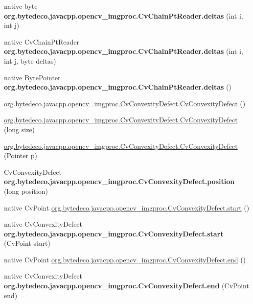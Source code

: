 \begin{DoxyCompactItemize}
native byte {\bfseries org.\+bytedeco.\+javacpp.\+opencv\+\_\+imgproc.\+Cv\+Chain\+Pt\+Reader.\+deltas} (int i, int j)
\item 
\mbox{\label{group__imgproc_gabe75007a635d826599cc4dc184bb489d}} 
native Cv\+Chain\+Pt\+Reader {\bfseries org.\+bytedeco.\+javacpp.\+opencv\+\_\+imgproc.\+Cv\+Chain\+Pt\+Reader.\+deltas} (int i, int j, byte deltas)
\item 
\mbox{\label{group__imgproc_ga1b1a34929239a97f33c9557cb26f3fef}} 
native Byte\+Pointer {\bfseries org.\+bytedeco.\+javacpp.\+opencv\+\_\+imgproc.\+Cv\+Chain\+Pt\+Reader.\+deltas} ()
\item 
\hyperlink{group__imgproc_ga5c579571d2c7ce238f166ac14d106dc0}{org.\+bytedeco.\+javacpp.\+opencv\+\_\+imgproc.\+Cv\+Convexity\+Defect.\+Cv\+Convexity\+Defect} ()
\item 
\hyperlink{group__imgproc_ga1bab8a5b2d8b0d218e13be2962c89bcf}{org.\+bytedeco.\+javacpp.\+opencv\+\_\+imgproc.\+Cv\+Convexity\+Defect.\+Cv\+Convexity\+Defect} (long size)
\item 
\hyperlink{group__imgproc_ga3ad9202789ae5ba03887b3a07a817674}{org.\+bytedeco.\+javacpp.\+opencv\+\_\+imgproc.\+Cv\+Convexity\+Defect.\+Cv\+Convexity\+Defect} (Pointer p)
\item 
\mbox{\label{group__imgproc_ga2b31965ab789a7387e133d5be5b1d6d4}} 
Cv\+Convexity\+Defect {\bfseries org.\+bytedeco.\+javacpp.\+opencv\+\_\+imgproc.\+Cv\+Convexity\+Defect.\+position} (long position)
\item 
native Cv\+Point \hyperlink{group__imgproc_gac3e9f4d6fda01551329024c0375d6ebb}{org.\+bytedeco.\+javacpp.\+opencv\+\_\+imgproc.\+Cv\+Convexity\+Defect.\+start} ()
\item 
\mbox{\label{group__imgproc_gab4d5d62f7df7e71f9ad218facb69aff2}} 
native Cv\+Convexity\+Defect {\bfseries org.\+bytedeco.\+javacpp.\+opencv\+\_\+imgproc.\+Cv\+Convexity\+Defect.\+start} (Cv\+Point start)
\item 
native Cv\+Point \hyperlink{group__imgproc_ga615474a436d4aa8cf5e74cbc1648f50b}{org.\+bytedeco.\+javacpp.\+opencv\+\_\+imgproc.\+Cv\+Convexity\+Defect.\+end} ()
\item 
\mbox{\label{group__imgproc_ga7ae2647f6d1d6e7f6bf5f965bba3cb57}} 
native Cv\+Convexity\+Defect {\bfseries org.\+bytedeco.\+javacpp.\+opencv\+\_\+imgproc.\+Cv\+Convexity\+Defect.\+end} (Cv\+Point end)

\end{DoxyCompactItemize}
